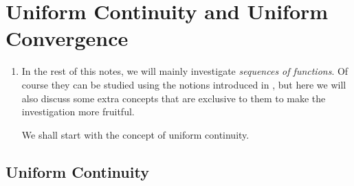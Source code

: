 \section{Uniform Continuity and Uniform Convergence}
\label{sect:unif-cont-conv}
\begin{enumerate}
\item In the rest of this notes, we will mainly investigate \emph{sequences of
functions}. Of course they can be studied using the notions introduced in
, but here we will also discuss some extra concepts
that are exclusive to them to make the investigation more fruitful.

We shall start with the concept of uniform continuity.
\end{enumerate}
\subsection{Uniform Continuity}
